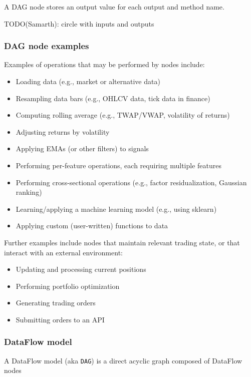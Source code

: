 \documentclass[11pt, reqno]{amsart}
\theoremstyle{definition}
\theoremstyle{remark}
\begin{document}
A DAG node stores an output value for each output and method name.

TODO(Samarth): circle with inputs and outputs

\subsubsection{DAG node examples}
Examples of operations that may be performed by nodes include:

\begin{itemize}
  \item Loading data (e.g., market or alternative data)
  \item Resampling data bars (e.g., OHLCV data, tick data in finance)
  \item Computing rolling average (e.g., TWAP/VWAP, volatility of returns)
  \item Adjusting returns by volatility
  \item Applying EMAs (or other filters) to signals
  \item Performing per-feature operations, each requiring multiple features
  \item Performing cross-sectional operations (e.g., factor residualization,
        Gaussian ranking)
  \item Learning/applying a machine learning model (e.g., using sklearn)
  \item Applying custom (user-written) functions to data
\end{itemize}

Further examples include nodes that maintain relevant trading state, or
that interact with an external environment:

\begin{itemize}
  \item Updating and processing current positions
  \item Performing portfolio optimization
  \item Generating trading orders
  \item Submitting orders to an API
\end{itemize}

\subsubsection{DataFlow model}
A DataFlow model (aka \verb|DAG|) is a direct acyclic graph composed of
DataFlow nodes
\end{document}
